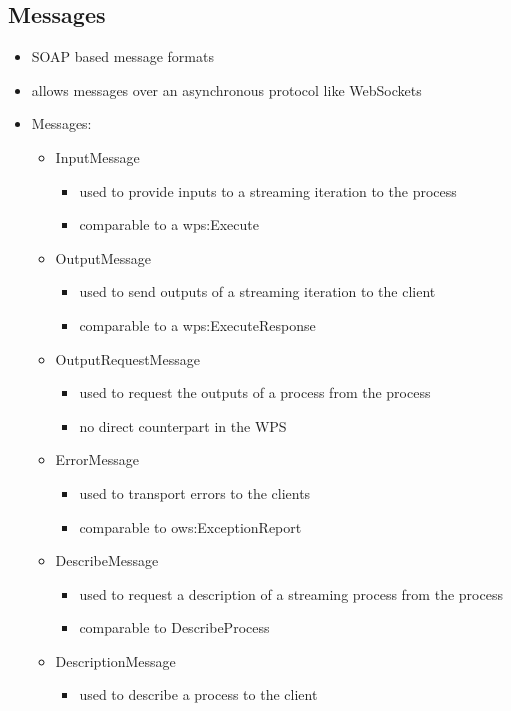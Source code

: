 	\subsection{Messages}
		\begin{itemize}
			\item SOAP based message formats
			\item allows messages over an asynchronous protocol like WebSockets
			\item Messages:
			\begin{itemize}
				\item InputMessage
				\begin{itemize}
					\item used to provide inputs to a streaming iteration to the process
					\item comparable to a wps:Execute
				\end{itemize}
				\item OutputMessage
				\begin{itemize}
					\item used to send outputs of a streaming iteration to the client
					\item comparable to a wps:ExecuteResponse
				\end{itemize}
				\item OutputRequestMessage
				\begin{itemize}
					\item used to request the outputs of a process from the process
					\item no direct counterpart in the WPS
				\end{itemize}
				\item ErrorMessage
				\begin{itemize}
					\item used to transport errors to the clients
					\item comparable to ows:ExceptionReport
				\end{itemize}
				\item DescribeMessage
				\begin{itemize}
					\item used to request a description of a streaming process from the process
					\item comparable to DescribeProcess
				\end{itemize}
				\item DescriptionMessage
				\begin{itemize}
					\item used to describe a process to the client

\end{itemize}
\end{itemize}
\end{itemize}
